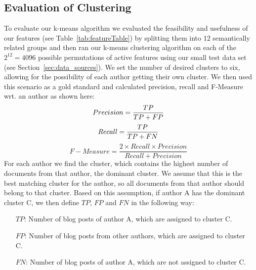 \subsection{Evaluation of Clustering}
\label{sec:evaluation_clustering}
To evaluate our k-means algorithm we evaluated the feasibility and usefulness of our features (see Table~\ref{tab:featureTable}) by splitting them into 12 semantically related groups and then ran our k-means clustering algorithm on each of the $2^{12} = 4096$ possible permutations of active features using our small test data set (see Section~\ref{sec:data_sources}).
We set the number of desired clusters to six, allowing for the possibility of each author getting their own cluster.
We then used this scenario as a gold standard and calculated precision, recall and F-Measure wrt. an author as shown here:
\begin{equation}
	Precision = \frac{TP}{TP + FP} \\
	\label{eq:precision}
\end{equation}
\begin{equation}
	Recall = \frac{TP}{TP + FN} \\
	\label{eq:recall}
\end{equation}
\begin{equation}
	F-Measure = \frac{2 \times Recall \times Precision}{Recall + Precision}
	\label{eq:fMeasure}
\end{equation}
For each author we find the cluster, which contains the highest number of documents from that author, the dominant cluster.
We assume that this is the best matching cluster for the author, so all documents from that author should belong to that cluster.
Based on this assumption, if author A has the dominant cluster C, we then define $TP$, $FP$ and $FN$ in the following way:
\begin{itemize}
	\item[$TP$:] Number of blog posts of author A, which are assigned to cluster C. \\
	\item[$FP$:] Number of blog posts from other authors, which are assigned to cluster C. \\
	\item[$FN$:] Number of blog posts of author A, which are not assigned to cluster C.
\end{itemize}

